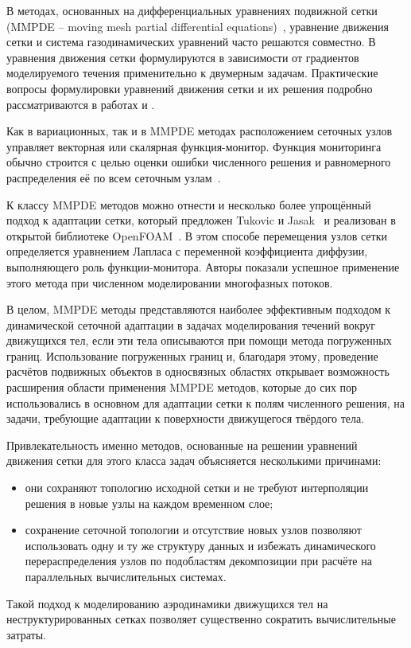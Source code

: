 	В методах, основанных на дифференциальных уравнениях подвижной сетки (MMPDE – moving mesh partial differential equations)~\cite{huang_moving_1994}, уравнение движения сетки и система газодинамических уравнений часто решаются совместно. В \cite{huang_moving_1998, huang_analysis_1997, huang_high_1998} уравнения движения сетки формулируются в зависимости от градиентов моделируемого течения применительно к двумерным задачам. Практические вопросы формулировки уравнений движения сетки и их решения подробно рассматриваются в работах \cite{huang_practical_2001} и \cite{budd_adaptivity_2009}.
	
	Как в вариационных, так и в MMPDE методах расположением сеточных узлов управляет векторная или скалярная функция-монитор. Функция мониторинга обычно строится с целью оценки ошибки численного решения и равномерного распределения её по всем сеточным узлам~\cite{cao_study_1999}.
	
	К классу MMPDE методов можно отнести и несколько более упрощённый подход к адаптации сетки, который предложен Tukovic и Jasak~\cite{jasak_automatic_2006, tukovic_moving_2012} и реализован в открытой библиотеке OpenFOAM~\cite{jasak_dynamic_2010}. В этом способе перемещения узлов сетки определяется уравнением Лапласа с переменной коэффициента диффузии, выполняющего роль функции-монитора. Авторы показали успешное применение этого метода при численном моделировании многофазных потоков.
	
	В целом, MMPDE методы представляются наиболее эффективным подходом к динамической сеточной адаптации в задачах моделирования течений вокруг движущихся тел, если эти тела описываются при помощи метода погруженных границ. Использование погруженных границ и, благодаря этому, проведение расчётов подвижных объектов в односвязных областях открывает возможность расширения области применения MMPDE методов, которые до сих пор использовались в основном для адаптации сетки к полям численного решения, на задачи, требующие адаптации к поверхности движущегося твёрдого тела. 
	
	Привлекательность именно методов, основанные на решении уравнений движения сетки для этого класса задач объясняется несколькими причинами:
	\begin{itemize}
		\item они сохраняют топологию исходной сетки и не требуют интерполяции решения в новые узлы на каждом временном слое;
		\item сохранение сеточной топологии и отсутствие новых узлов позволяют использовать одну и ту же структуру данных и избежать динамического перераспределения узлов по подобластям декомпозиции при расчёте на параллельных вычислительных системах.
	\end{itemize}
	Такой подход к моделированию аэродинамики движущихся тел на неструктурированных сетках позволяет существенно сократить вычислительные затраты.
	
	